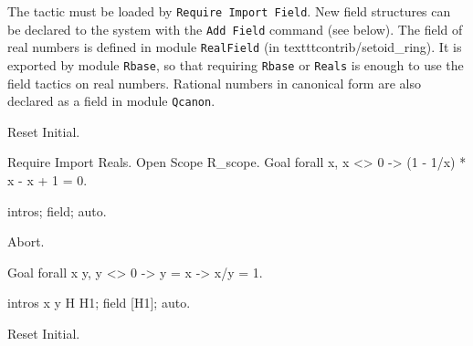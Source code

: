 The tactic must be loaded by \texttt{Require Import Field}. New field
structures can be declared to the system with the \texttt{Add Field}
command (see below). The field of real numbers is defined in module
\texttt{RealField} (in texttt{contrib/setoid\_ring}). It is exported
by module \texttt{Rbase}, so that requiring \texttt{Rbase} or
\texttt{Reals} is enough to use the field tactics on real
numbers. Rational numbers in canonical form are also declared as a
field in module \texttt{Qcanon}.


\Example
\begin{coq_eval}
Reset Initial.
\end{coq_eval}
\begin{coq_example}
Require Import Reals.
Open Scope R_scope.
Goal forall x,  x <> 0 ->
   (1 - 1/x) * x - x + 1 = 0.
\end{coq_example}
\begin{coq_example}
intros; field; auto.
\end{coq_example}
\begin{coq_eval}
Abort.
\end{coq_eval}
\begin{coq_example}
Goal forall x y, y <> 0 -> y = x -> x/y = 1.
\end{coq_example}
\begin{coq_example}
intros x y H H1; field [H1]; auto.
\end{coq_example} 
\begin{coq_eval}
Reset Initial.
\end{coq_eval}

